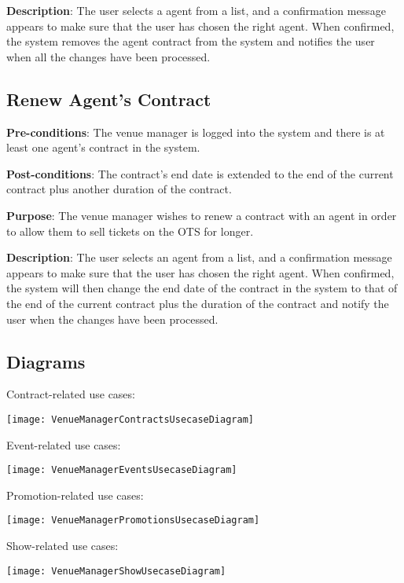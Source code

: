 \textbf{Description}: The user selects a agent from a list,
and a confirmation message appears to make sure that the
user has chosen the right agent. When confirmed, the system
removes the agent contract from the system and notifies
the user when all the changes have been processed.

\subsection{Renew Agent's Contract}
\textbf{Pre-conditions}: The venue manager is logged into the system
and there is at least one agent's contract in the system.

\textbf{Post-conditions}: The contract's end date is extended to the
end of the current contract plus another duration of the contract.

\textbf{Purpose}: The venue manager wishes to renew a contract with
an agent in order to allow them to sell tickets on the OTS for longer.

\textbf{Description}: The user selects an agent from a list,
and a confirmation message appears to make sure that the user
has chosen the right agent. When confirmed, the system will
then change the end date of the contract in the system to that
of the end of the current contract plus the duration of the
contract and notify the user when the changes have been processed.

\subsection{Diagrams}
Contract-related use cases:

\texttt{[image: VenueManagerContractsUsecaseDiagram]}

Event-related use cases:

\texttt{[image: VenueManagerEventsUsecaseDiagram]}

Promotion-related use cases:

\texttt{[image: VenueManagerPromotionsUsecaseDiagram]}

Show-related use cases:

\texttt{[image: VenueManagerShowUsecaseDiagram]}
